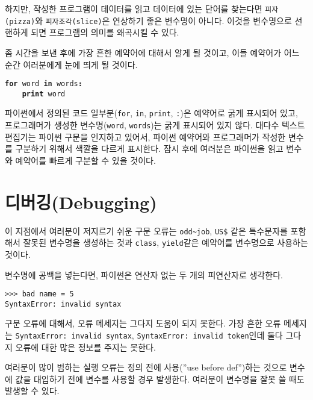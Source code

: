 하지만, 작성한 프로그램이 데이터를 읽고 데이터에 있는 단어를 찾는다면 {\tt 피자(pizza)}와 {\tt 피자조각(slice)}은 연상하기 좋은 변수명이 아니다. 이것을 변수명으로 선핸하게 되면 프로그램의 의미를 왜곡시킬 수 있다.

좀 시간을 보낸 후에 가장 흔한 예약어에 대해서 알게 될 것이고, 이들 예약어가 어느 순간 여러분에게 눈에 띄게 될 것이다.

{\tt {\bf for} word {\bf in} words{\bf :}\\
\verb"    "{\bf print} word }

파이썬에서 정의된 코드 일부분({\tt for}, {\tt in}, {\tt print}, {\tt :})은 예약어로 굵게 표시되어 있고, 
프로그래머가 생성한 변수명({\tt word}, {\tt words})는 굵게 표시되어 있지 않다. 
대다수 텍스트 편집기는 파이썬 구문을 인지하고 있어서, 
파이썬 예약어와 프로그래머가 작성한 변수를 구분하기 위해서 색깔을 다르게 표시한다. 
잠시 후에 여러분은 파이썬을 읽고 변수와 예약어를 빠르게 구분할 수 있을 것이다.

\section{디버깅(Debugging)}

이 지점에서 여러분이 저지르기 쉬운 구문 오류는 \verb"odd~job", \verb"US$" 같은 특수문자를 포함해서 잘못된 변수명을 생성하는 것과 {\tt class}, {\tt yield}같은 예약어를 변수명으로 사용하는 것이다. 


변수명에 공백을 넣는다면, 파이썬은 연산자 없는 두 개의 피연산자로 생각한다.

\beforeverb
\begin{verbatim}
>>> bad name = 5
SyntaxError: invalid syntax
\end{verbatim}
\afterverb
%
구문 오류에 대해서, 오류 메세지는 그다지 도움이 되지 못한다. 
가장 흔한 오류 메세지는 {\tt SyntaxError: invalid syntax}, {\tt SyntaxError: invalid token}인데 둘다 그다지 오류에 대한 많은 정보를 주지는 못한다.


여러분이 많이 범하는 실행 오류는 정의 전에 사용(''use before def'')하는 것으로 변수에 값을 대입하기 전에 변수를 사용할 경우 발생한다. 여러분이 변수명을 잘못 쓸 때도 발생할 수 있다.

